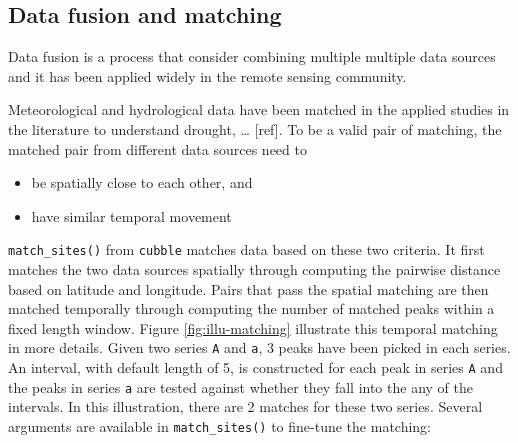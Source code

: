 \documentclass[
]{jss}
\providecommand{\tightlist}{%
  \setlength{\itemsep}{0pt}\setlength{\parskip}{0pt}}
\begin{document}
\hypertarget{data-fusion-and-matching}{%
\subsection{Data fusion and matching}\label{data-fusion-and-matching}}

Data fusion is a process that consider combining multiple multiple data
sources and it has been applied widely in the remote sensing community.

Meteorological and hydrological data have been matched in the applied
studies in the literature to understand drought, \ldots{} {[}ref{]}. To
be a valid pair of matching, the matched pair from different data
sources need to

\begin{itemize}
\tightlist
\item
  be spatially close to each other, and
\item
  have similar temporal movement
\end{itemize}

\texttt{match\_sites()} from \texttt{cubble} matches data based on these
two criteria. It first matches the two data sources spatially through
computing the pairwise distance based on latitude and longitude. Pairs
that pass the spatial matching are then matched temporally through
computing the number of matched peaks within a fixed length window.
Figure \ref{fig:illu-matching} illustrate this temporal matching in more
details. Given two series \texttt{A} and \texttt{a}, 3 peaks have been
picked in each series. An interval, with default length of 5, is
constructed for each peak in series \texttt{A} and the peaks in series
\texttt{a} are tested against whether they fall into the any of the
intervals. In this illustration, there are 2 matches for these two
series. Several arguments are available in \texttt{match\_sites()} to
fine-tune the matching:
\end{document}
